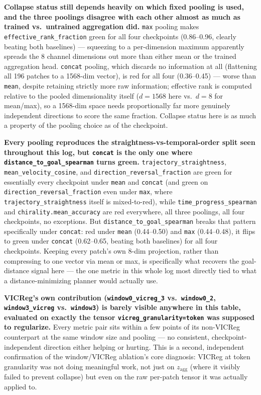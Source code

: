 \textbf{Collapse status still depends heavily on which fixed pooling is used, and the
three poolings disagree with each other almost as much as trained vs.\ untrained
aggregation did.} \texttt{max} pooling makes \texttt{effective\_rank\_fraction} green for
all four checkpoints (0.86--0.96, clearly beating both baselines) --- squeezing to a
per-dimension maximum apparently spreads the 8 channel dimensions out more than either
mean or the trained aggregation head. \texttt{concat} pooling, which discards no
information at all (flattening all 196 patches to a 1568-dim vector), is red for all
four (0.36--0.45) --- worse than \texttt{mean}, despite retaining strictly more raw
information; effective rank is computed relative to the pooled dimensionality itself
($d{=}1568$ here vs.\ $d{=}8$ for mean/max), so a 1568-dim space needs proportionally
far more genuinely independent directions to score the same fraction. Collapse status
here is as much a property of the pooling choice as of the checkpoint.

\textbf{Every pooling reproduces the straightness-vs-temporal-order split seen
throughout this log, but \texttt{concat} is the only one where
\texttt{distance\_to\_goal\_spearman} turns green.} \texttt{trajectory\_straightness},
\texttt{mean\_velocity\_cosine}, and \texttt{direction\_reversal\_fraction} are green for
essentially every checkpoint under \texttt{mean} and \texttt{concat} (and green on
\texttt{direction\_reversal\_fraction} even under \texttt{max}, where
\texttt{trajectory\_straightness} itself is mixed-to-red), while
\texttt{time\_progress\_spearman} and \texttt{chirality.mean\_accuracy} are red
everywhere, all three poolings, all four checkpoints, no exceptions. But
\texttt{distance\_to\_goal\_spearman} breaks that pattern specifically under
\texttt{concat}: red under \texttt{mean} (0.44--0.50) and \texttt{max} (0.44--0.48), it
flips to green under \texttt{concat} (0.62--0.65, beating both baselines) for all four
checkpoints. Keeping every patch's own 8-dim projection, rather than compressing to one
vector via mean or max, is specifically what recovers the goal-distance signal here ---
the one metric in this whole log most directly tied to what a distance-minimizing
planner would actually use.

\textbf{VICReg's own contribution (\texttt{window0\_vicreg\_3} vs.\ \texttt{window0\_2},
\texttt{window3\_vicreg} vs.\ \texttt{window3}) is barely visible anywhere in this
table, evaluated on exactly the tensor \texttt{vicreg\_granularity=token} was supposed to
regularize.} Every metric pair sits within a few points of its non-VICReg counterpart at
the same window size and pooling --- no consistent, checkpoint-independent direction
either helping or hurting. This is a second, independent confirmation of the window/VICReg
ablation's core diagnosis: VICReg at token granularity was not doing meaningful work,
not just on $z_{\mathrm{agg}}$ (where it visibly failed to prevent collapse) but even on
the raw per-patch tensor it was actually applied to.
